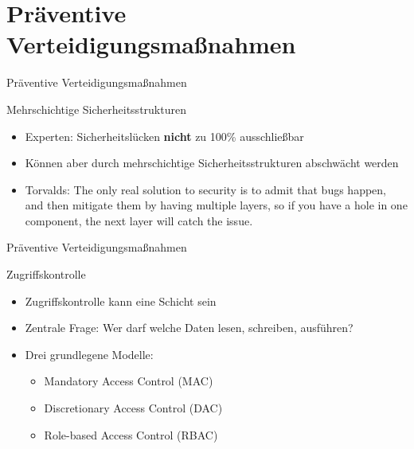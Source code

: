 \newcommand{\gqq}[1]{\glqq#1\grqq}

\section{Präventive Verteidigungsmaßnahmen}

\begin{frame}{Präventive Verteidigungsmaßnahmen}
  \begin{block}{Mehrschichtige Sicherheitsstrukturen}
    \begin{itemize}[<+->]
      \item Experten: Sicherheitslücken \textbf{nicht} zu 100\% ausschließbar
      \item Können aber durch mehrschichtige Sicherheitsstrukturen abschwächt werden
      \item Torvalds: \gqq{The only real solution to security is to admit that bugs happen, and then mitigate them by having multiple layers, so if you have a hole in one component, the next layer will catch the issue.} \footnotemark
    \end{itemize}
  \end{block}

\end{frame}

\begin{frame}{Präventive Verteidigungsmaßnahmen}
  \begin{block}{Zugriffskontrolle}
    \begin{itemize}[<+->]
      \item Zugriffskontrolle kann eine Schicht sein
      \item Zentrale Frage: Wer darf welche Daten lesen, schreiben, ausführen?
      \item Drei grundlegene Modelle:
      \begin{itemize}[<+->]
        \item Mandatory Access Control (MAC)
        \item Discretionary Access Control (DAC)
        \item Role-based Access Control (RBAC)
      \end{itemize}
    \end{itemize}
  \end{block}
\end{frame}

